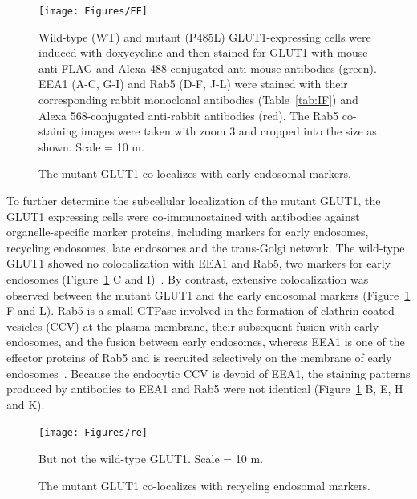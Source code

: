 \begin{figure}[h]
\centering
\texttt{[image: Figures/EE]}
\caption{The mutant GLUT1 co-localizes with early endosomal markers.}
\vspace*{-3mm}
\small \justify
Wild-type (WT) and mutant (P485L) GLUT1-expressing cells were induced with doxycycline and then stained for GLUT1 with mouse anti-FLAG and Alexa 488-conjugated anti-mouse antibodies (green). EEA1 (A-C, G-I) and Rab5 (D-F, J-L) were stained with their corresponding rabbit monoclonal antibodies (Table~\ref{tab:IF}) and Alexa 568-conjugated anti-rabbit antibodies (red). The Rab5 co-staining images were taken with zoom 3 and cropped into the size as shown. Scale = 10 \textmu m.
\label{fig:ee}
\end{figure}
To further determine the subcellular localization of the mutant GLUT1, the GLUT1 expressing cells were co-immunostained with antibodies against organelle-specific marker proteins, including markers for early endosomes, recycling endosomes, late endosomes and the trans-Golgi network. The wild-type GLUT1 showed no colocalization with EEA1 and Rab5, two markers for early endosomes (Figure~\ref{fig:ee} C and I)~\cite{Mu}. By contrast, extensive colocalization was observed between the mutant GLUT1 and the early endosomal markers (Figure~\ref{fig:ee} F and L). Rab5 is a small GTPase involved in the formation of clathrin-coated vesicles (CCV) at the plasma membrane, their subsequent fusion with early endosomes, and the fusion between early endosomes, whereas EEA1 is one of the effector proteins of Rab5 and is recruited selectively on the membrane of early endosomes~\cite{Christoforidis,Rubino,Ballmer}. Because the endocytic CCV is devoid of EEA1, the staining patterns produced by antibodies to EEA1 and Rab5 were not identical (Figure~\ref{fig:ee} B, E, H and K). 

\begin{figure}[h]
\centering
\texttt{[image: Figures/re]}
\caption{The mutant GLUT1 co-localizes with recycling endosomal markers.}
\vspace*{-3mm}
\small \justify
But not the wild-type GLUT1. Scale = 10 \textmu m.
\label{fig:re}
\end{figure}

